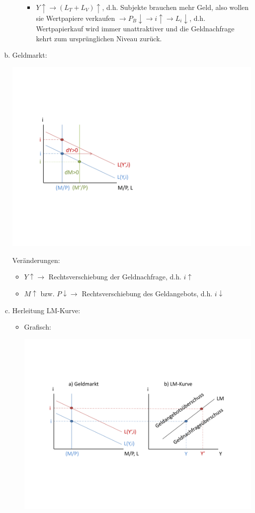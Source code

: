 \documentclass{scrartcl}
\begin{document}
\begin{enumerate}[(a)]
\begin{enumerate}[(i)]
\begin{itemize}
      \item $Y\uparrow\rightarrow (L_T+L_V)\uparrow$, d.h. Subjekte brauchen mehr Geld, also wollen sie Wertpapiere verkaufen $\rightarrow P_B \downarrow \rightarrow i \uparrow \rightarrow L_i \downarrow$, d.h. Wertpapierkauf wird immer unattraktiver und die Geldnachfrage kehrt zum urspr\"{u}nglichen Niveau zur\"{u}ck.
    \end{itemize}
  \end{enumerate}
  \item Geldmarkt:
  \begin{center}
  \includegraphics[width=.5\textwidth]{Bilder/Keynes_Geldmarkt.pdf}
  \end{center}
  Ver\"{a}nderungen:
  \begin{itemize}
    \item $Y \uparrow \rightarrow$ Rechtsverschiebung der Geldnachfrage, d.h. $i\uparrow$
    \item $M\uparrow$ bzw. $P \downarrow \rightarrow$ Rechtsverschiebung des Geldangebots, d.h. $i \downarrow$
  \end{itemize}
  \item Herleitung LM-Kurve:
  \begin{itemize}
    \item Grafisch:
  \begin{center}
  \includegraphics[width=\textwidth]{Bilder/Keynes_LM.pdf}\\

\end{center}
\end{itemize}
\end{enumerate}
\end{document}

